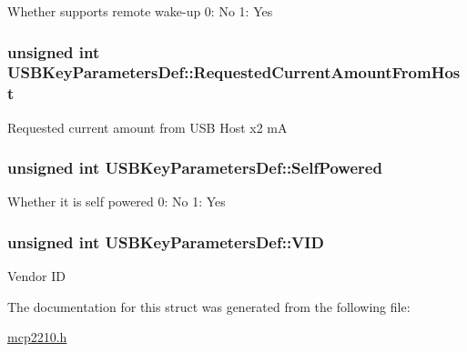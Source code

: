 \-Whether supports remote wake-\/up 0\-: \-No 1\-: \-Yes \hypertarget{struct_u_s_b_key_parameters_def_a37e6e0ff7720d067ea185fd9b19d0ba8}{
\subsubsection[{\-Requested\-Current\-Amount\-From\-Host}]{\setlength{\rightskip}{0pt plus 5cm}unsigned int {\bf \-U\-S\-B\-Key\-Parameters\-Def\-::\-Requested\-Current\-Amount\-From\-Host}}}\label{struct_u_s_b_key_parameters_def_a37e6e0ff7720d067ea185fd9b19d0ba8}
\-Requested current amount from \-U\-S\-B \-Host x2 m\-A \hypertarget{struct_u_s_b_key_parameters_def_aace169dc444713da0e0c0f5672d64bd0}{
\subsubsection[{\-Self\-Powered}]{\setlength{\rightskip}{0pt plus 5cm}unsigned int {\bf \-U\-S\-B\-Key\-Parameters\-Def\-::\-Self\-Powered}}}\label{struct_u_s_b_key_parameters_def_aace169dc444713da0e0c0f5672d64bd0}
\-Whether it is self powered 0\-: \-No 1\-: \-Yes \hypertarget{struct_u_s_b_key_parameters_def_a35d04341dee0696d60990dfe9b066835}{
\subsubsection[{\-V\-I\-D}]{\setlength{\rightskip}{0pt plus 5cm}unsigned int {\bf \-U\-S\-B\-Key\-Parameters\-Def\-::\-V\-I\-D}}}\label{struct_u_s_b_key_parameters_def_a35d04341dee0696d60990dfe9b066835}
\-Vendor \-I\-D 

\-The documentation for this struct was generated from the following file\-:\begin{DoxyCompactItemize}
\item 
\hyperlink{mcp2210_8h}{mcp2210.\-h}\end{DoxyCompactItemize}
